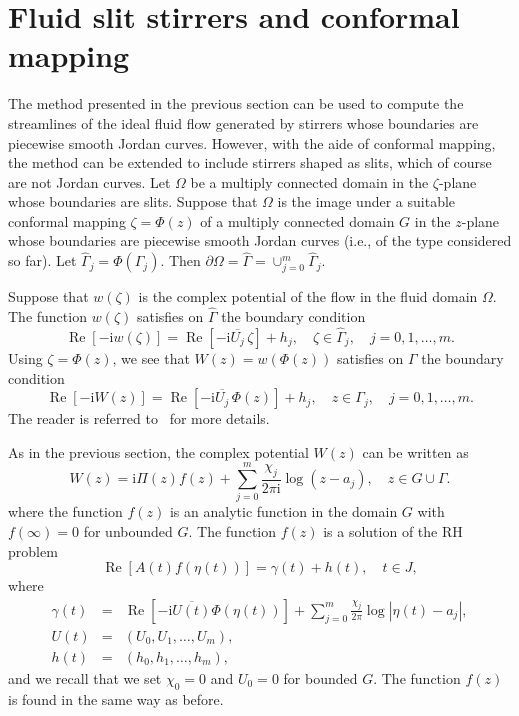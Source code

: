 \documentclass[11pt,a4paper]{article}
\renewcommand{\Re}{\mathop{\mathrm{Re}}}
\renewcommand{\i}{\mathrm{i}}
\renewcommand{\Re}{\mathop{\mathrm{Re}}}
\renewcommand{\i}{\mathrm{i}}
\begin{document}
\section{Fluid slit stirrers and conformal mapping}
\label{sc:wall}

The method presented in the previous section can be used to compute the streamlines of the ideal fluid flow generated by stirrers whose boundaries are piecewise smooth Jordan curves. 
However, with the aide of conformal mapping, the method can be extended to include stirrers shaped as slits, which of course are not Jordan curves. 
Let $\Omega$ be a multiply connected domain in the $\zeta$-plane whose boundaries are slits. Suppose that $\Omega$ is the image under a suitable conformal mapping $\zeta=\Phi(z)$ of a multiply connected domain $G$ in the $z$-plane whose boundaries are piecewise smooth Jordan curves (i.e., of the type considered so far). Let $\hat\Gamma_j=\Phi(\Gamma_j)$. Then $\partial\Omega=\hat\Gamma=\cup_{j=0}^{m}\hat\Gamma_j$. 

Suppose that $w(\zeta)$ is the complex potential of the flow in the fluid domain $\Omega$. The function $w(\zeta)$ satisfies on $\hat\Gamma$ the boundary condition
\begin{equation}\label{e:w-cd-zt}
\Re[-\i w(\zeta)]=\Re[-\i\overline{U_j}\,\zeta]+h_j, \quad \zeta\in \hat\Gamma_j, \quad j=0,1,\ldots,m.
\end{equation}
Using $\zeta=\Phi(z)$, we see that $W(z)=w(\Phi(z))$ satisfies on $\Gamma$ the boundary condition
\begin{equation}\label{e:W-cd-zt}
\Re[-\i W(z)]=\Re[-\i\overline{U_j}\,\Phi(z)]+h_j, \quad z\in\Gamma_j, \quad j=0,1,\ldots,m.
\end{equation}
The reader is referred to~\cite{cro-str} for more details.

As in the previous section, the complex potential $W(z)$ can be written as
\begin{equation}\label{e:w-f-W}
W(z)=\i\Pi(z)f(z)+\sum_{j=0}^m \frac{\chi_j}{2\pi\i}\log(z-a_j), \quad z\in G\cup\Gamma.
\end{equation}
where the function $f(z)$ is an analytic function in the domain $G$ with $f(\infty)=0$ for unbounded $G$. The function $f(z)$ is a solution of the RH problem
\begin{equation}\label{e:f-rhp-W}
\Re[A(t)f(\eta(t))] =\gamma(t)+h(t), \quad t\in J,
\end{equation}
where
\begin{eqnarray}
\label{e:gam-rhp-W}
\gamma(t)&=&\Re[-\i\overline{U(t)}\Phi(\eta(t))]+\sum_{j=0}^m \frac{\chi_j}{2\pi}\log|\eta(t)-a_j|, \\
\label{e:U-rhp-W}
U(t)&=& (U_0,U_1,\ldots,U_m), \\
\label{e:h-rhp-W}
h(t)&=& (h_0,h_1,\ldots,h_m),
\end{eqnarray}
and we recall that we set $\chi_0=0$ and $U_0=0$ for bounded $G$.
The function $f(z)$ is found in the same way as before.
\end{document}
